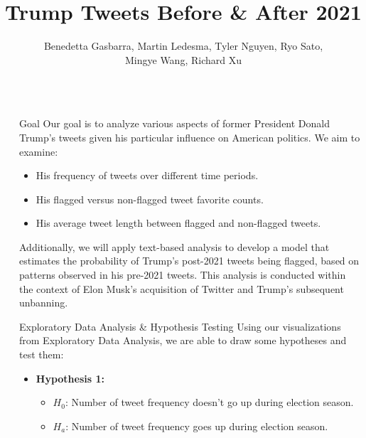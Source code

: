 \documentclass[final]{beamer}
\title{\huge Trump Tweets Before \& After 2021}
\author{
    Benedetta Gasbarra, Martin Ledesma, Tyler Nguyen, Ryo Sato, \\Mingye Wang, Richard Xu}
\newlength{\sepwidth}
\newlength{\colwidth}
\newcommand{\separatorcolumn}{\begin{column}{\sepwidth}\end{column}}
\begin{document}
\begin{frame}[t]
\begin{columns}[t]
\separatorcolumn
\begin{column}{\colwidth}

  \begin{block}{Goal}
    Our goal is to analyze various aspects of former President Donald Trump's tweets given his particular influence on American politics. We aim to examine:
    \vspace{-15pt}
    \begin{itemize}
        \item His frequency of tweets over different time periods.
        \item His flagged versus non-flagged tweet favorite counts.
        \item His average tweet length between flagged and non-flagged tweets.
    \end{itemize}
    \vspace{-15pt}
    Additionally, we will apply text-based analysis to develop a model that estimates the probability of Trump's post-2021 tweets being flagged, based on patterns observed in his pre-2021 tweets. This analysis is conducted within the context of Elon Musk's acquisition of Twitter and Trump's subsequent unbanning.
  \end{block}
 \vspace{-15pt}
  \begin{block}{Exploratory Data Analysis \& Hypothesis Testing}
  Using our visualizations from Exploratory Data Analysis, we are able to draw some hypotheses and test them:
  \vspace{-15pt}
  \begin{itemize}
            \item \textbf{Hypothesis 1:}
            \begin{itemize}
                    \item[] $H_0$: Number of tweet frequency doesn’t go up during election season.
                    \item[] $H_a$: Number of tweet frequency goes up during election season.
                \end{itemize}
                \begin{figure}
                    \centering
                    \hfill

\end{figure}
\end{itemize}
\end{block}
\end{column}
\end{columns}
\end{frame}
\end{document}

